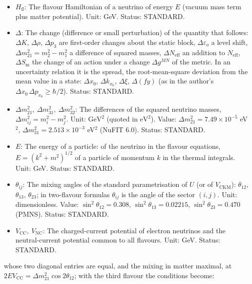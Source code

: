 \documentclass[
  10pt,
]{article}
\providecommand{\tightlist}{%
  \setlength{\itemsep}{0pt}\setlength{\parskip}{0pt}}
\begin{document}
\begin{itemize}
\tightlist
\item
  \(H_{\mathrm{fl}}\): The flavour Hamiltonian of a neutrino of energy
  \(E\) (vacuum mass term plus matter potential). Unit: GeV. Status:
  STANDARD.
\item
  \(\Delta\): The change (difference or small perturbation) of the
  quantity that follows: \(\Delta K\), \(\Delta\rho\), \(\Delta p_3\)
  are first-order changes about the static block,
  \(\Delta\varepsilon_o\) a level shift,
  \(\Delta m^2_{21} = m_2^2 - m_1^2\) a difference of squared masses,
  \(\Delta N_{\mathrm{eff}}\) an addition to \(N_{\mathrm{eff}}\),
  \(\Delta S_{\mathrm{m}}\) the change of an action under a change
  \(\Delta g^{MN}\) of the metric. In an uncertainty relation it is the
  spread, the root-mean-square deviation from the mean value in a state:
  \(\Delta x_0\), \(\Delta k_{x_0}\), \(\Delta\xi\), \(\Delta(fy)\) (as
  in the author's \(\Delta x_0\,\Delta p_{x_0} \ge \hbar/2\)). Status:
  STANDARD.
\item
  \(\Delta m_{21}^2,\ \Delta m_{31}^2,\ \Delta m_{32}^2\): The
  differences of the squared neutrino masses,
  \(\Delta m_{ij}^2 = m_i^2 - m_j^2\). Unit: \(\mathrm{GeV}^{2}\)
  (quoted in \(\mathrm{eV}^{2}\)). Value:
  \(\Delta m_{21}^2 = 7.49\times10^{-5}\) eV\(^2\),
  \(\Delta m_{31}^2 = 2.513\times10^{-3}\) eV\(^2\) (NuFIT 6.0). Status:
  STANDARD.
\item
  \(E\): The energy of a particle: of the neutrino in the flavour
  equations, \(E = (k^2 + m^2)^{1/2}\) of a particle of momentum \(k\)
  in the thermal integrals. Unit: GeV. Status: STANDARD.
\item
  \(\theta_{ij}\): The mixing angles of the standard parametrisation of
  \(U\) (or of \(V_{\mathrm{CKM}}\)): \(\theta_{12}\), \(\theta_{13}\),
  \(\theta_{23}\); in two-flavour formulas \(\theta_{ij}\) is the angle
  of the sector \((i, j)\). Unit: dimensionless. Value:
  \(\sin^2\theta_{12} = 0.308\), \(\sin^2\theta_{13} = 0.02215\),
  \(\sin^2\theta_{23} = 0.470\) (PMNS). Status: STANDARD.
\item
  \(V_{\mathrm{CC}},\ V_{\mathrm{NC}}\): The charged-current potential
  of electron neutrinos and the neutral-current potential common to all
  flavours. Unit: GeV. Status: STANDARD.
\end{itemize}

whose two diagonal entries are equal, and the mixing in matter maximal,
at \(2EV_{\mathrm{CC}} = \Delta m_{21}^2\cos2\theta_{12}\); with the
third flavour the conditions become:
\end{document}
